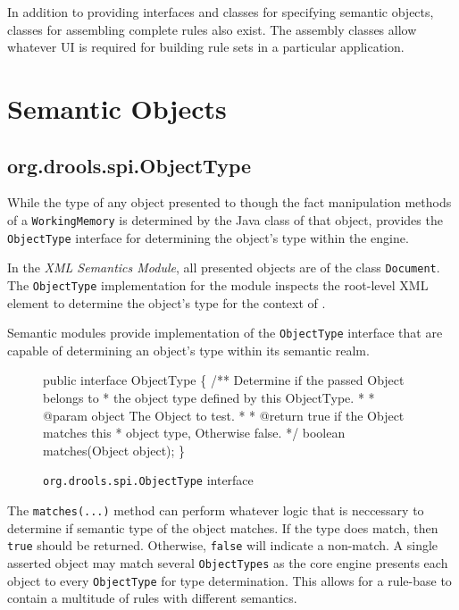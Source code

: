 In addition to providing interfaces and classes for specifying
semantic objects, classes for assembling complete rules also exist.
The assembly classes allow whatever UI is required for building rule
sets in a particular application.  

\section{Semantic Objects}

\subsection{org.drools.spi.ObjectType}

While the type of any object presented to \drools{} though
the fact manipulation methods of a \verb|WorkingMemory| is determined
by the Java class of that object, \drools{} provides the
\verb|ObjectType| interface for determining the object's type within
the engine.

In the \emph{XML Semantics Module}, all presented objects are of the
class \verb|Document|.  The \verb|ObjectType| implementation
for the module inspects the root-level XML element to determine the
object's type for the context of \drools{}.

Semantic modules provide implementation of the \verb|ObjectType|
interface that are capable of determining an object's type within
its semantic realm.

\begin{figure}
\begin{codelisting}
public interface ObjectType
\{
    /** Determine if the passed Object belongs to 
     *  the object type defined by this ObjectType.
     *
     *  @param object The Object to test.
     *
     *  @return true if the Object matches this 
     *          object type, Otherwise false.
     */
    boolean matches(Object object);
\}
\end{codelisting}
\caption{\texttt{org.drools.spi.ObjectType} interface}
\label{code.ObjectType}
\end{figure}

The \verb|matches(...)| method can perform whatever logic that is
neccessary to determine if semantic type of the object matches.  If
the type does match, then \verb|true| should be returned.  Otherwise, 
\verb|false| will indicate a non-match. A single asserted object may 
match several \verb|ObjectTypes| as the core engine presents each 
object to every \verb|ObjectType| for type determination.  This
allows for a rule-base to contain a multitude of rules with different
semantics.  

